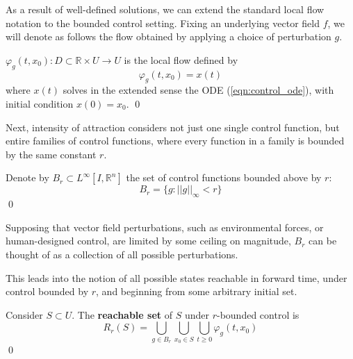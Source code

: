 As a result of well-defined solutions, we can extend the standard local flow notation to the bounded control setting. Fixing an underlying vector field $f$, we will denote as follows the flow obtained by applying a choice of perturbation $g$.

\begin{definition} 
	$\varphi_g(t, x_0): D \subset \mathbb{R} \times U \to U$ is the local flow defined by $$\varphi_g(t, x_0) = x(t)$$ where $x(t)$ solves in the extended sense the ODE (\ref{eqn:control_ode}), with initial condition $x(0) = x_0$. \qed
\end{definition}

Next, intensity of attraction considers not just one single control function, but entire families of control functions, where every function in a family is bounded by the same constant $r$. 

\begin{definition}
	Denote by $B_r \subset L^\infty[I, \mathbb{R}^n]$ the set of control functions bounded above by $r$:
	$$B_r = \{g  : ||g||_\infty < r\}$$ \qed
\end{definition}

Supposing that vector field perturbations, such as environmental forces, or human-designed control, are limited by some ceiling on magnitude, $B_r$ can be thought of as a collection of all possible perturbations. 



This leads into the notion of all possible states reachable in forward time, under control bounded by $r$, and beginning from some arbitrary initial set. 

\begin{definition}
	Consider $S\subset  U$. The \textbf{reachable set} of $S$ under $r$-bounded control is
	$$R_r(S) =  \bigcup\limits_{g \in B_r} \bigcup\limits_{x_0 \in S} \bigcup\limits_{t \geq 0}  \varphi_g(t,x_0)$$ \qed
\end{definition}

